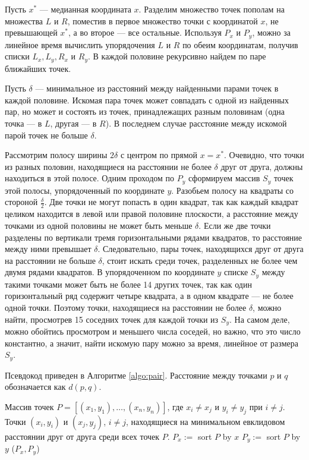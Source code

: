 \documentclass[a4paper,12pt]{article}
\begin{document}
Пусть $x^*$ --- медианная координата $x$. Разделим множество точек пополам на множества $L$ и $R$, поместив в первое множество точки с координатой $x$, не превышающей $x^*$, а во второе --- все остальные. Используя $P_x$ и $P_y$, можно за линейное время вычислить упорядочения $L$ и $R$ по обеим координатам, получив списки $L_x, L_y, R_x$ и $R_y$. В каждой половине рекурсивно найдем по паре ближайших точек.

Пусть $\delta$ --- минимальное из расстояний между найденными парами точек в каждой половине. Искомая пара точек может совпадать с одной из найденных пар, но может и состоять из точек, принадлежащих разным половинам (одна точка --- в $L$, другая --- в $R$). В последнем случае расстояние между искомой парой точек не больше $\delta$.

Рассмотрим полосу ширины $2\delta$ с центром по прямой $x = x^*$. Очевидно, что точки из разных половин, находящиеся на расстоянии не более $\delta$ друг от друга, должны находиться в этой полосе. Одним проходом по $P_y$ сформируем массив $S_y$ точек этой полосы, упорядоченный по координате $y$. Разобьем полосу на квадраты со стороной $\frac{\delta}{2}$. Две точки не могут попасть в один квадрат, так как каждый квадрат целиком находится в левой или правой половине плоскости, а расстояние между точками из одной половины не может быть меньше $\delta$. Если же две точки разделены по вертикали тремя горизонтальными рядами квадратов, то расстояние между ними превышает $\delta$. Следовательно, пары точек, находящихся друг от друга на расстоянии не больше $\delta$, стоит искать среди точек, разделенных не более чем двумя рядами квадратов. В упорядоченном по координате $y$ списке $S_y$ между такими точками может быть не более 14 других точек, так как один горизонтальный ряд содержит четыре квадрата, а в одном квадрате --- не более одной точки. Поэтому точки, находящиеся на расстоянии не более $\delta$, можно найти, просмотрев 15 соседних точек для каждой точки из $S_y$. На самом деле, можно обойтись просмотром и меньшего числа соседей, но важно, что это число константно, а значит, найти искомую пару можно за время, линейное от размера $S_y$.

Псевдокод приведен в Алгоритме \ref{algo:pair}. Расстояние между точками $p$ и $q$ обозначается как $d(p, q)$.
 
\begin{algorithm}[H]
  	\caption{($P$)}
	\label{algo:pair}
	\begin{algorithmic}
		\Require Массив точек $P = [(x_1, y_1), \dots, (x_n, y_n)]$, где $x_i \neq x_j$ и $y_i \neq y_j$ при $i \neq j$.
		\Ensure Точки $(x_i, y_i)$ и $(x_j, y_j)$, $i \neq j$, находящиеся на минимальном евклидовом расстоянии друг от друга среди всех точек $P$.
		\State
		\State $P_x :=$ sort $P$ by $x$
		\State $P_y :=$ sort $P$ by $y$
		\State \Return {}($P_x, P_y$)
	\end{algorithmic}
\end{algorithm}
\end{document}
